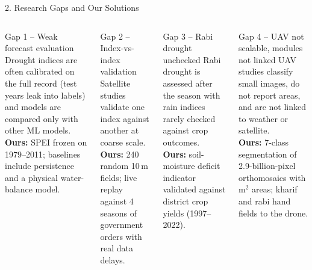 \documentclass[aspectratio=169,10pt]{beamer}
\begin{document}
\begin{frame}{2. Research Gaps and Our Solutions}
\begin{columns}[T]
\begin{alertblock}{Gap 1 -- Weak forecast evaluation}
\footnotesize Drought indices are often calibrated on the full record (test years leak into labels) and models are compared only with other ML models.\\[2pt]
\textcolor{good}{\textbf{Ours:}} SPEI frozen on 1979--2011; baselines include persistence and a physical water-balance model.
\end{alertblock}
\begin{alertblock}{Gap 2 -- Index-vs-index validation}
\footnotesize Satellite studies validate one index against another at coarse scale.\\[2pt]
\textcolor{good}{\textbf{Ours:}} 240 random 10\,m fields; live replay against 4 seasons of government orders with real data delays.
\end{alertblock}
\begin{alertblock}{Gap 3 -- Rabi drought unchecked}
\footnotesize Rabi drought is assessed after the season with rain indices rarely checked against crop outcomes.\\[2pt]
\textcolor{good}{\textbf{Ours:}} soil-moisture deficit indicator validated against district crop yields (1997--2022).
\end{alertblock}
\begin{alertblock}{Gap 4 -- UAV not scalable, modules not linked}
\footnotesize UAV studies classify small images, do not report areas, and are not linked to weather or satellite.\\[2pt]
\textcolor{good}{\textbf{Ours:}} 7-class segmentation of 2.9-billion-pixel orthomosaics with m$^2$ areas; kharif and rabi hand fields to the drone.
\end{alertblock}
\end{columns}
\end{frame}
\end{document}
